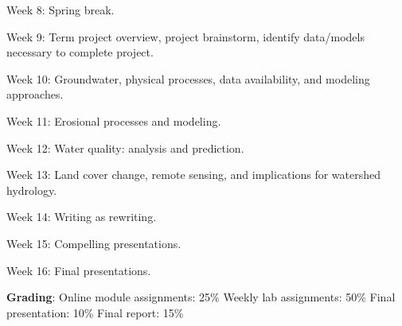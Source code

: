 \documentclass[
]{article}
\begin{document}
Week 8: Spring break.

Week 9: Term project overview, project brainstorm, identify data/models
necessary to complete project.

Week 10: Groundwater, physical processes, data availability, and
modeling approaches.

Week 11: Erosional processes and modeling.

Week 12: Water quality: analysis and prediction.

Week 13: Land cover change, remote sensing, and implications for
watershed hydrology.

Week 14: Writing as rewriting.

Week 15: Compelling presentations.

Week 16: Final presentations.

\textbf{Grading}: Online module assignments: 25\% Weekly lab
assignments: 50\% Final presentation: 10\% Final report: 15\%
\end{document}
